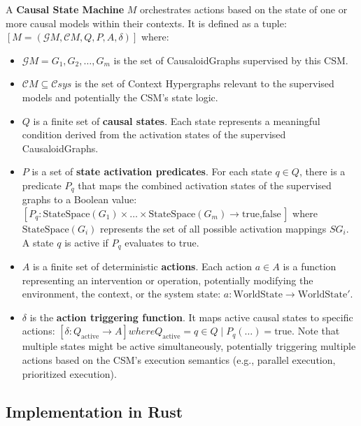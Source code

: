 A \textbf{Causal State Machine} $ M $ orchestrates actions based on the state of one or more causal models within their contexts. It is defined as a tuple:
$[ M = (\mathcal{G}{M}, \mathcal{C}{M}, Q, P, A, \delta) ]$
where:
\begin{itemize}
\item $ \mathcal{G}{M} = {G_1, G_2, \dots, G_m} $ is the set of CausaloidGraphs supervised by this CSM.
\item $ \mathcal{C}{M} \subseteq \mathcal{C}{sys} $ is the set of Context Hypergraphs relevant to the supervised models and potentially the CSM's state logic.
\item $ Q $ is a finite set of \textbf{causal states}. Each state represents a meaningful condition derived from the activation states of the supervised CausaloidGraphs.
\item $ P $ is a set of \textbf{state activation predicates}. For each state $ q \in Q $, there is a predicate $ P_q $ that 
maps the combined activation states of the supervised graphs to a Boolean value:
$[ P_q: \text{StateSpace}(G_1) \times \dots \times \text{StateSpace}(G_m) \to {\text{true}, \text{false}} ]$
where $ \text{StateSpace}(G_i) $ represents the set of all possible activation mappings $ S{G_i} $. A state $ q $ is active if $ P_q $ evaluates to true. 
\item $ A $ is a finite set of deterministic \textbf{actions}. Each action $ a \in A $ is a function representing an intervention or operation, potentially modifying the environment, the context, or the system state: $ a: \text{WorldState} \to \text{WorldState}' $.
\item $ \delta $ is the \textbf{action triggering function}. It maps active causal states to specific actions:
$ [ \delta: Q_{\text{active}} \to A ]where  Q_{\text{active}} = { q \in Q \mid P_q(\dots) = \text{true} } $. 
Note that multiple states might be active simultaneously, potentially triggering multiple actions based on the CSM's execution semantics (e.g., parallel execution, prioritized execution).
\end{itemize}

\newpage

\subsection{Implementation in Rust}
\label{subsec:rust_implementation}

